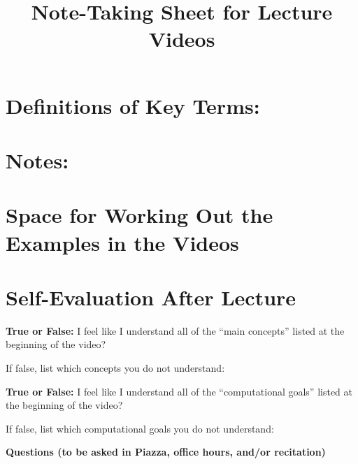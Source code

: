 \documentclass[nooutcomes]{ximera}
\title{Note-Taking Sheet for Lecture Videos}
\begin{document}
\begin{abstract}		\end{abstract}
\maketitle

\section*{Definitions of Key Terms:}

\vfill


\section*{Notes:}

\vfill





\newpage





\section*{Space for Working Out the Examples in the Videos}

\vfill
\vfill
\vfill


\section*{Self-Evaluation After Lecture}

\textbf{True or False:}  I feel like I understand all of the ``main concepts'' listed at the beginning of the video?

If false, list which concepts you do not understand:

\vspace{6mm}

\textbf{True or False:}  I feel like I understand all of the ``computational goals'' listed at the beginning of the video?

If false, list which computational goals you do not understand:

\vspace{6mm}

\begin{large}
\textbf{Questions (to be asked in Piazza, office hours,  and/or recitation)}
\end{large}

\vfill
\end{document}
